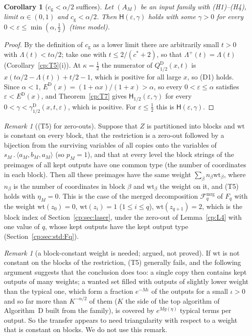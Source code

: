 \documentclass[11pt]{article}
\newtheorem{corollary}[theorem]{Corollary}
\theoremstyle{definition}
\theoremstyle{remark}
\newtheorem{remark}[theorem]{Remark}
\providecommand{\eps}{\varepsilon}
\newcommand{\mat}[3]{\langle #1,#2,#3\rangle} %
\newcommand{\cp}{\mathbin{.}}                 %
\newcommand{\Hyp}{\mathsf{H}}                 %
\newcommand{\Hypk}[1]{\mathsf{H}_{#1}}        %
\newcommand{\Lam}{\Lambda}                    %
\newcommand{\Lamp}{\Lambda^{+}}               %
\newcommand{\cg}{c_{\mathrm g}}               %
\newcommand{\cstar}{c^{*}}                    %
\newcommand{\Hcond}[1]{\textup{(H#1)}}        %
\newcommand{\Tcond}[1]{\textup{(T#1)}}        %
\newcommand{\Dcond}{\textup{(D1)}}            %
\newcommand{\AlgD}{Algorithm~D}                             %
\newcommand{\Qgain}[2]{Q^{#1}_{#2}}           %
\newcommand{\Erange}[1]{E^{#1}}               %
\newcommand{\gbound}[2]{\gamma^{#1}_{#2}}     %
\newcommand{\Fmrg}{\mathcal{F}^{\mathrm{mrg}}_q} %
\newcommand{\wt}{\mathrm{wt}}                %
\begin{document}
\begin{corollary}[$\cg<\alpha/2$ suffices]\label{cp:C2:half}
Let $(A_M)$ be an input family with \Hcond1--\Hcond4, limit $\alpha\in(0,1)$ and $\cg<\alpha/2$. Then $\Hyp(\eps,\gamma)$ holds with some $\gamma>0$ for every $0<\eps\le\min(\alpha,\frac12)$ (time model).
\end{corollary}

\begin{proof}
By the definition of $\cg$ as a lower limit there are arbitrarily small $t>0$ with $\Lam(t)<t\alpha/2$; take one with $t\le2/(\cstar+2)$, so that $\Lamp(t)=\Lam(t)$ (Corollary~\ref{cp:T5}(i)). At $\kappa=\frac12$ the numerator of $\Qgain{\mathrm D}{1/2}(x,t)$ is $x(t\alpha/2-\Lam(t))+t/2-1$, which is positive for all large $x$, so \Dcond{} holds. Since $\alpha<1$, $\Erange{\mathrm D}(x)=(1+\alpha x)/(1+x)>\alpha$, so every $0<\eps\le\alpha$ satisfies $\eps<\Erange{\mathrm D}(x)$, and Theorem~\ref{cp:T7} gives $\Hypk{1/2}(\eps,\gamma)$ for every $0<\gamma<\gbound{\mathrm D}{1/2}(x,t,\eps)$, which is positive. For $\eps\le\frac12$ this is $\Hyp(\eps,\gamma)$.
\end{proof}

\begin{remark}[\Tcond5{} for zero-outs]\label{cp:C3}
Suppose that $Z$ is partitioned into blocks and $\wt$ is constant on every block, that the restriction is a zero-out followed by a bijection from the surviving variables of all copies onto the variables of $s_M\cp\mat{a_M}{b_M}{a_M}$ (so $p_M=1$), and that at every level the block strings of the preimages of all kept outputs have one common type (the number of coordinates in each block). Then all these preimages have the same weight $\sum_\beta n_\beta\wt_\beta$, where $n_\beta$ is the number of coordinates in block $\beta$ and $\wt_\beta$ the weight on it, and \Tcond5{} holds with $\eta_M=0$. This is the case of the merged decomposition $\Fmrg$ of $F_q$ with the weight $\wt(z_0)=0$, $\wt(z_i)=1$ ($1\le i\le q$), $\wt(z_{q+1})=2$, which is the block index of Section~\ref{cp:sec:laser}, under the zero-out of Lemma~\ref{cp:L4} with one value of $q$, whose kept outputs have the kept output type (Section~\ref{cp:sec:std:Fq}).
\end{remark}

\begin{remark}[a block-constant weight is needed; argued, not proved]\label{cp:C3:nec}
If $\wt$ is not constant on the blocks of the restriction, \Tcond5{} generally fails, and the following argument suggests that the conclusion does too: a single copy then contains kept outputs of many weights; a wanted set filled with outputs of slightly lower weight than the typical one, which form a fraction $e^{-M\iota}$ of the outputs for a small $\iota>0$ and so far more than $K^{-\alpha/2}$ of them ($K$ the side of the top algorithm of \AlgD{} built from the family), is covered by $e^{Mg(\eta)}$ typical terms per output. So the transfer appears to need triangularity with respect to a weight that is constant on blocks. We do not use this remark.
\end{remark}
\end{document}
